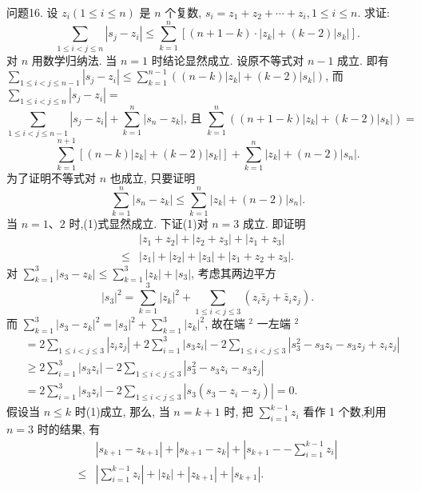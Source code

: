 问题16. 设 $z_i(1 \leqslant i \leqslant n)$ 是 $n$ 个复数, $s_i=z_1+z_2+\cdots+z_i, 1 \leqslant i \leqslant n$. 求证:
$$
\sum_{1 \leqslant i<j \leqslant n}\left|s_j-z_i\right| \leqslant \sum_{k=1}^n\left[(n+1-k) \cdot\left|z_k\right|+(k-2)\left|s_k\right|\right] .
$$
对 $n$ 用数学归纳法.
当 $n=1$ 时结论显然成立.
设原不等式对 $n-1$ 成立.
即有 $\sum_{1 \leqslant i<j \leqslant n-1}\left|s_j-z_i\right| \leqslant \sum_{k=1}^{n-1}\left((n-k)\left|z_k\right|+(k-2)\left|s_k\right|\right)$, 而 $\sum_{1 \leqslant i<j \leqslant n}\left|s_j-z_i\right|=$
$$
\sum_{1 \leqslant i<j \leqslant n-1}\left|s_j-z_i\right|+\sum_{k=1}^n\left|s_n-z_k\right| \text {, 且 } \sum_{k=1}^n\left((n+1-k)\left|z_k\right|+(k-2)\left|s_k\right|\right)=
$$
$$
\sum_{k=1}^{n+1}\left[(n-k)\left|z_k\right|+(k-2)\left|s_k\right|\right]+\sum_{k=1}^n\left|z_k\right|+(n-2)\left|s_n\right| .
$$
为了证明不等式对 $n$ 也成立, 只要证明
$$
\sum_{k=1}^n\left|s_n-z_k\right| \leqslant \sum_{k=1}^n\left|z_k\right|+(n-2)\left|s_n\right| . \label{(1)}
$$
当 $n=1 、 2$ 时,(1)式显然成立.
下证(1)对 $n=3$ 成立.
即证明
$$
\begin{aligned}
& \left|z_1+z_2\right|+\left|z_2+z_3\right|+\left|z_1+z_3\right| \\
\leqslant & \left|z_1\right|+\left|z_2\right|+\left|z_3\right|+\left|z_1+z_2+z_3\right| .
\end{aligned}
$$
对 $\sum_{k=1}^3\left|s_3-z_k\right| \leqslant \sum_{k=1}^3\left|z_k\right|+\left|s_3\right|$, 考虑其两边平方
$$
\left|s_3\right|^2=\sum_{k=1}^3\left|z_k\right|^2+\sum_{1 \leqslant i<j \leqslant 3}\left(z_i \bar{z}_j+\bar{z}_i z_j\right) .
$$
而 $\sum_{k=1}^3\left|s_3-z_k\right|^2=\left|s_3\right|^2+\sum_{k=1}^3\left|z_k\right|^2$, 故在端 ${ }^2$ 一左端 ${ }^2$
$$
\begin{aligned}
& =2 \sum_{1 \leqslant i<j \leqslant 3}\left|z_i z_j\right|+2 \sum_{i=1}^3\left|s_3 z_i\right|-2 \sum_{1 \leqslant i<j \leqslant 3}\left|s_3^2-s_3 z_i-s_3 z_j+z_i z_j\right| \\
& \geqslant 2 \sum_{i=1}^3\left|s_3 z_i\right|-2 \sum_{1 \leqslant i<j \leqslant 3}\left|s_3^2-s_3 z_i-s_3 z_j\right| \\
& =2 \sum_{i=1}^3\left|s_3 z_i\right|-2 \sum_{1 \leqslant i<j \leqslant 3}\left|s_3\left(s_3-z_i-z_j\right)\right|=0 .
\end{aligned}
$$
假设当 $n \leqslant k$ 时(1)成立, 那么, 当 $n=k+1$ 时, 把 $\sum_{i=1}^{k-1} z_i$ 看作 1 个数,利用 $n=3$ 时的结果, 有
$$
\begin{aligned}
& \left|s_{k+1}-z_{k+1}\right|+\left|s_{k+1}-z_k\right|+\left|s_{k+1}--\sum_{i=1}^{k-1} z_i\right| \\
\leqslant & \left|\sum_{i=1}^{k-1} z_i\right|+\left|z_k\right|+\left|z_{k+1}\right|+\left|s_{k+1}\right| . 
\end{aligned} \label{(2)}
$$
